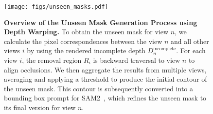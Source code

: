 \begin{figure}[t]
    \centering
    \texttt{[image: figs/unseen\_masks.pdf]}
    \vspace{-6mm}
    \caption{\textbf{Overview of the Unseen Mask Generation Process using Depth Warping.} To obtain the unseen mask for view $n$, we calculate the pixel correspondences between the view $n$ and all other views $i$ by using the rendered incomplete depth $D_{n}^{\text{incomplete}}$. For each view $i$, the removal region $R_i$ is backward traversal to view $n$ to align occlusions. We then aggregate the results from multiple views, averaging and applying a threshold to produce the initial contour of the unseen mask. This contour is subsequently converted into a bounding box prompt for SAM2~\cite{ravi2024sam2}, which refines the unseen mask to its final version for view $n$.}
    \label{fig:unseen_masks}
    \vspace{-1mm}
\end{figure}




